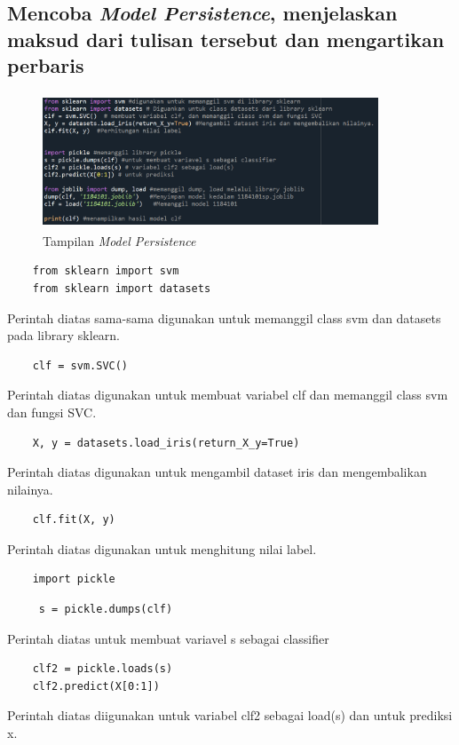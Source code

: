 \documentclass{article}
\begin{document}
\subsection{Mencoba \textit{Model Persistence}, menjelaskan maksud dari tulisan tersebut dan mengartikan perbaris}

    \begin{figure}[!htbp]
            \centering
            \includegraphics[width=10cm,height=4cm]{figures/1184101/chapter1/19.PNG}
            \caption{Tampilan \textit{Model Persistence}}
            \label{penanda}
            \end{figure}

\begin{verbatim}
    from sklearn import svm
    from sklearn import datasets
\end{verbatim}
Perintah diatas sama-sama digunakan untuk memanggil class svm dan datasets pada library sklearn.

\begin{verbatim}
    clf = svm.SVC()
\end{verbatim}
Perintah diatas digunakan untuk membuat variabel clf dan memanggil class svm dan fungsi SVC.

\begin{verbatim}
    X, y = datasets.load_iris(return_X_y=True)
\end{verbatim}
Perintah diatas digunakan untuk mengambil dataset iris dan mengembalikan nilainya.

\begin{verbatim}
    clf.fit(X, y)
\end{verbatim}
Perintah diatas digunakan untuk menghitung nilai label.

\begin{verbatim}
    import pickle
\end{verbatim}

\begin{verbatim}
     s = pickle.dumps(clf)
\end{verbatim}
Perintah diatas untuk membuat variavel s sebagai classifier
\begin{verbatim}
    clf2 = pickle.loads(s)
    clf2.predict(X[0:1])
\end{verbatim}
Perintah diatas diigunakan untuk variabel clf2 sebagai load(s) dan untuk prediksi x.
\end{document}
